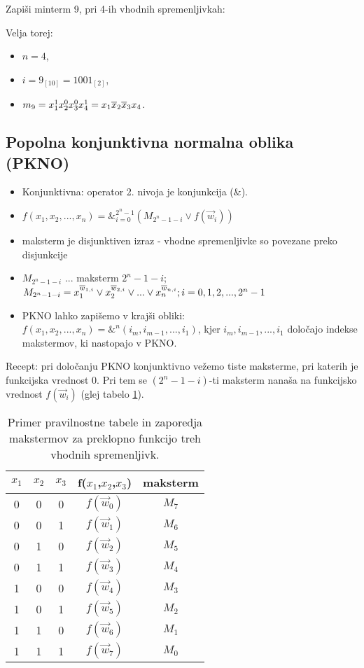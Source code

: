 \begin{zgled}
Zapiši minterm 9, pri 4-ih vhodnih spremenljivkah:
\end{zgled}

\begin{resitev}
Velja torej:
\begin{itemize}
\item $n=4$,
\item $i = 9_{[10]} = 1001_{[2]}$,
\item $m_9 = x_1^1 x_2^0 x_3^0 x_4^1 = x_1 \overline x_2 \overline x_3 x_4$.
\end{itemize}
\end{resitev}

\subsection{Popolna konjunktivna normalna oblika (PKNO)}
\begin{itemize}
\item Konjunktivna: operator 2. nivoja je konjunkcija ($\&$).
\item $f(x_1,x_2,...,x_n)=\&_{i=0}^{2^{n}-1}\left( M_{2^{n}-1-i} \vee f(\vec{w}_i)\right)$
\item maksterm je disjunktiven izraz - vhodne spremenljivke so povezane preko disjunkcije
\item $M_{2^{n}-1-i}$ ... maksterm $2^{n}-1-i$; $M_{2^{n}-1-i} = x_1^{\overline w_{1,i}} \vee x_2^{\overline w_{2,i}} \vee ... \vee x_n^{\overline w_{n,i}}; i=0,1,2,...,2^n-1$
\item PKNO lahko zapišemo v krajši obliki: $f(x_1,x_2,...,x_n)=\&^n(i_m,i_{m-1},...,i_1)$, kjer $i_m,i_{m-1},...,i_1$ določajo indekse makstermov, ki nastopajo v PKNO.
\end{itemize}

Recept: pri določanju PKNO konjunktivno vežemo tiste maksterme, pri katerih je funkcijska vrednost 0. Pri tem se $(2^n-1-i)$-ti maksterm nanaša na funkcijsko vrednost $f(\vec{w}_i)$ (glej tabelo \ref{tab:makstermi}).


\begin{table}[ht]
\centering
\begin{tabular}{ccc|c|c}
$x_1$ & $x_2$ & $x_3$ & f($x_1$,$x_2$,$x_3$) & maksterm\\
\hline
0 & 0 & 0 & $f(\vec{w}_0)$ & $M_7$ \\
0 & 0 & 1 & $f(\vec{w}_1)$ & $M_6$ \\
0 & 1 & 0 & $f(\vec{w}_2)$ & $M_5$ \\
0 & 1 & 1 & $f(\vec{w}_3)$ & $M_4$ \\
1 & 0 & 0 & $f(\vec{w}_4)$ & $M_3$ \\
1 & 0 & 1 & $f(\vec{w}_5)$ & $M_2$ \\
1 & 1 & 0 & $f(\vec{w}_6)$ & $M_1$ \\
1 & 1 & 1 & $f(\vec{w}_7)$ & $M_0$ \\
\end{tabular}
\caption{Primer pravilnostne tabele in zaporedja makstermov za preklopno funkcijo treh vhodnih spremenljivk.}
\label{tab:makstermi}
\end{table}

